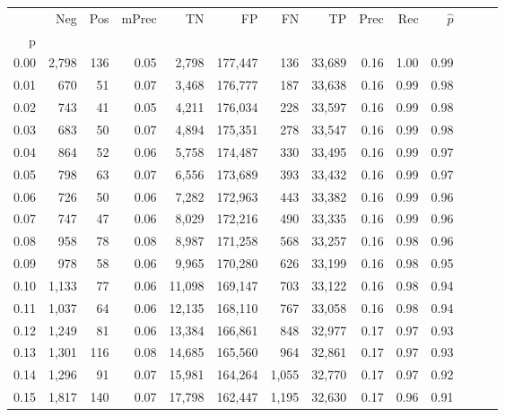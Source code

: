 \begin{tabular}{rrrrrrrrrrrrrr}
\toprule
{} &    Neg &  Pos & mPrec &       TN &       FP &      FN &      TP &  Prec &   Rec & $\hat{p}$ \\
p    &        &      &       &          &          &         &         &       &       &           \\
\midrule
0.00 &  2,798 &  136 &  0.05 &    2,798 &  177,447 &     136 &  33,689 &  0.16 &  1.00 &      0.99 \\
0.01 &    670 &   51 &  0.07 &    3,468 &  176,777 &     187 &  33,638 &  0.16 &  0.99 &      0.98 \\
0.02 &    743 &   41 &  0.05 &    4,211 &  176,034 &     228 &  33,597 &  0.16 &  0.99 &      0.98 \\
0.03 &    683 &   50 &  0.07 &    4,894 &  175,351 &     278 &  33,547 &  0.16 &  0.99 &      0.98 \\
0.04 &    864 &   52 &  0.06 &    5,758 &  174,487 &     330 &  33,495 &  0.16 &  0.99 &      0.97 \\
0.05 &    798 &   63 &  0.07 &    6,556 &  173,689 &     393 &  33,432 &  0.16 &  0.99 &      0.97 \\
0.06 &    726 &   50 &  0.06 &    7,282 &  172,963 &     443 &  33,382 &  0.16 &  0.99 &      0.96 \\
0.07 &    747 &   47 &  0.06 &    8,029 &  172,216 &     490 &  33,335 &  0.16 &  0.99 &      0.96 \\
0.08 &    958 &   78 &  0.08 &    8,987 &  171,258 &     568 &  33,257 &  0.16 &  0.98 &      0.96 \\
0.09 &    978 &   58 &  0.06 &    9,965 &  170,280 &     626 &  33,199 &  0.16 &  0.98 &      0.95 \\
0.10 &  1,133 &   77 &  0.06 &   11,098 &  169,147 &     703 &  33,122 &  0.16 &  0.98 &      0.94 \\
0.11 &  1,037 &   64 &  0.06 &   12,135 &  168,110 &     767 &  33,058 &  0.16 &  0.98 &      0.94 \\
0.12 &  1,249 &   81 &  0.06 &   13,384 &  166,861 &     848 &  32,977 &  0.17 &  0.97 &      0.93 \\
0.13 &  1,301 &  116 &  0.08 &   14,685 &  165,560 &     964 &  32,861 &  0.17 &  0.97 &      0.93 \\
0.14 &  1,296 &   91 &  0.07 &   15,981 &  164,264 &   1,055 &  32,770 &  0.17 &  0.97 &      0.92 \\
0.15 &  1,817 &  140 &  0.07 &   17,798 &  162,447 &   1,195 &  32,630 &  0.17 &  0.96 &      0.91 \\

\end{tabular}
